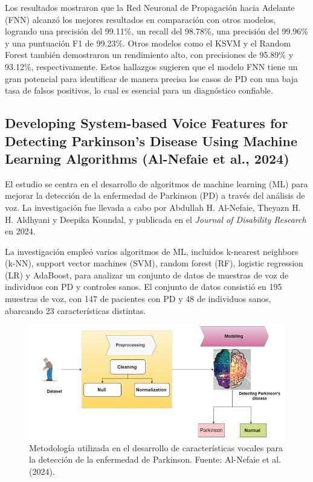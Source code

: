 \documentclass[listof=nochaptergap,12pt,times,authoryear]{report}
\begin{document}
Los resultados mostraron que la Red Neuronal de Propagación hacia Adelante (FNN) alcanzó los mejores resultados en comparación con otros modelos, logrando una precisión del 99.11\%, un recall del 98.78\%, una precisión del 99.96\% y una puntuación F1 de 99.23\%. Otros modelos como el KSVM y el Random Forest también demostraron un rendimiento alto, con precisiones de 95.89\% y 93.12\%, respectivamente. Estos hallazgos sugieren que el modelo FNN tiene un gran potencial para identificar de manera precisa los casos de PD con una baja tasa de falsos positivos, lo cual es esencial para un diagnóstico confiable.


\subsection{Developing System-based Voice Features for Detecting Parkinson’s Disease Using Machine Learning Algorithms (Al-Nefaie et al., 2024)}

El estudio se centra en el desarrollo de algoritmos de machine learning (ML) para mejorar la detección de la enfermedad de Parkinson (PD) a través del análisis de voz. La investigación fue llevada a cabo por Abdullah H. Al-Nefaie, Theyazn H. H. Aldhyani y Deepika Koundal, y publicada en el \textit{Journal of Disability Research} en 2024.

La investigación empleó varios algoritmos de ML, incluidos k-nearest neighbors (k-NN), support vector machines (SVM), random forest (RF), logistic regression (LR) y AdaBoost, para analizar un conjunto de datos de muestras de voz de individuos con PD y controles sanos. El conjunto de datos consistió en 195 muestras de voz, con 147 de pacientes con PD y 48 de individuos sanos, abarcando 23 características distintas.

\begin{figure}[H]
    \centering
    \includegraphics[width=\textwidth]{A3 - 1.png}
    \caption{Metodología utilizada en el desarrollo de características vocales para la detección de la enfermedad de Parkinson. Fuente: Al-Nefaie et al. (2024).}
    \label{fig:metodologia_sistema_vocal}
\end{figure}
\end{document}

